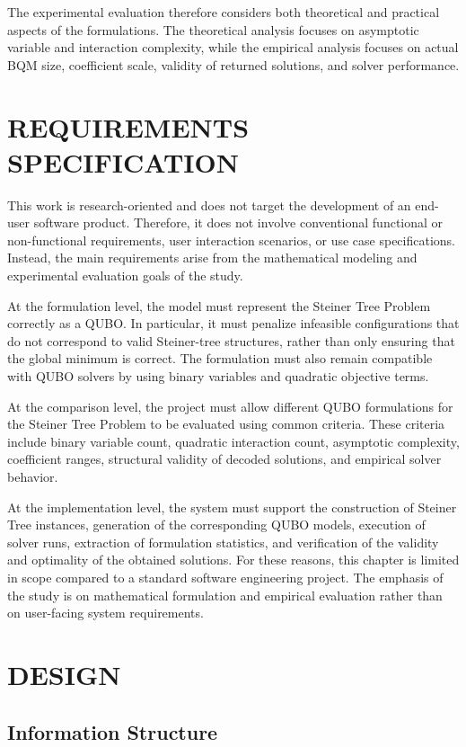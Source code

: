 \documentclass[a4paper,12pt]{report}
\begin{document}
The experimental evaluation therefore considers both theoretical and practical aspects of the formulations. The theoretical analysis focuses on asymptotic variable and interaction complexity, while the empirical analysis focuses on actual BQM size, coefficient scale, validity of returned solutions, and solver performance.

\chapter{REQUIREMENTS SPECIFICATION}

This work is research-oriented and does not target the development of an end-user software product. Therefore, it does not involve conventional functional or non-functional requirements, user interaction scenarios, or use case specifications. Instead, the main requirements arise from the mathematical modeling and experimental evaluation goals of the study.

At the formulation level, the model must represent the Steiner Tree Problem correctly as a QUBO. In particular, it must penalize infeasible configurations that do not correspond to valid Steiner-tree structures, rather than only ensuring that the global minimum is correct. The formulation must also remain compatible with QUBO solvers by using binary variables and quadratic objective terms.

At the comparison level, the project must allow different QUBO formulations for the Steiner Tree Problem to be evaluated using common criteria. These criteria include binary variable count, quadratic interaction count, asymptotic complexity, coefficient ranges, structural validity of decoded solutions, and empirical solver behavior.

At the implementation level, the system must support the construction of Steiner Tree instances, generation of the corresponding QUBO models, execution of solver runs, extraction of formulation statistics, and verification of the validity and optimality of the obtained solutions. For these reasons, this chapter is limited in scope compared to a standard software engineering project. The emphasis of the study is on mathematical formulation and empirical evaluation rather than on user-facing system requirements.

\chapter{DESIGN}

\section{Information Structure}
\end{document}
